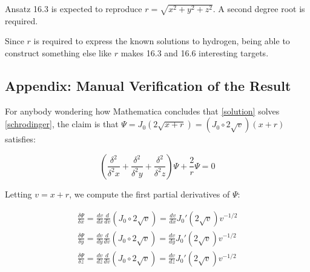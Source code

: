 \documentclass{article}
\def\coeff{\framebox(10,10){}}
\newcommand{\tikzmark}[1]{\tikz[overlay,remember picture] \node (#1) {};}
\begin{document}
Ansatz 16.3 is expected to reproduce $r=\sqrt{x^2+y^2+z^2}$.  A second degree root
is required.

Since $r$ is required to express the known solutions to hydrogen, being able to construct
something else like $r$ makes 16.3 and 16.6 interesting targets.

\vfill\eject
\subsection*{Appendix: Manual Verification of the Result}
For anybody wondering how Mathematica concludes that \eqref{solution} solves \eqref{schrodinger},
the claim is that $\Psi = J_0(2\sqrt{x+r}) = (J_0 \circ 2\sqrt{v}) (x+r)$ satisfies:

\begin{equation}
\label{claim}
\left(\frac{\delta^2}{\delta^2 x} + \frac{\delta^2}{\delta^2 y} + \frac{\delta^2}{\delta^2 z}\right) \Psi + \frac{2}{r}\Psi = 0
\end{equation}

\vskip 12pt

Letting $v=x+r$, we compute the first partial derivatives of $\Psi$:

\begin{equation}
\begin{gathered}
\frac{\delta \Psi}{\delta x} = \frac{d v}{d x} \frac{d}{d v} \left(J_0 \circ 2\sqrt{v}\right) = \frac{d v}{d x} J_0'(2\sqrt{v}) v^{-1/2} \\
\frac{\delta \Psi}{\delta y} = \frac{d v}{d y} \frac{d}{d v} \left(J_0 \circ 2\sqrt{v}\right) = \frac{d v}{d y} J_0'(2\sqrt{v}) v^{-1/2} \\
\frac{\delta \Psi}{\delta z} = \frac{d v}{d z} \frac{d}{d v} \left(J_0 \circ 2\sqrt{v}\right) = \frac{d v}{d z} J_0'(2\sqrt{v}) v^{-1/2}
\end{gathered}
\end{equation}
\end{document}
